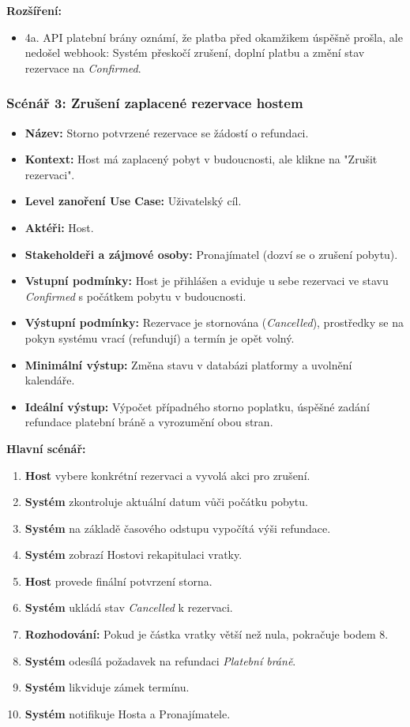 \documentclass[11pt, a4paper]{article}
\begin{document}
\noindent \textbf{Rozšíření:}
\begin{itemize}
    \item 4a. API platební brány oznámí, že platba před okamžikem úspěšně prošla, ale nedošel webhook: Systém přeskočí zrušení, doplní platbu a změní stav rezervace na \textit{Confirmed}.
\end{itemize}

\vspace{0.5cm}
\subsubsection{Scénář 3: Zrušení zaplacené rezervace hostem}
\begin{itemize}[leftmargin=*]
    \item \textbf{Název:} Storno potvrzené rezervace se žádostí o refundaci.
    \item \textbf{Kontext:} Host má zaplacený pobyt v budoucnosti, ale klikne na "Zrušit rezervaci".
    \item \textbf{Level zanoření Use Case:} Uživatelský cíl.
    \item \textbf{Aktéři:} Host.
    \item \textbf{Stakeholdeři a zájmové osoby:} Pronajímatel (dozví se o zrušení pobytu).
    \item \textbf{Vstupní podmínky:} Host je přihlášen a eviduje u sebe rezervaci ve stavu \textit{Confirmed} s počátkem pobytu v budoucnosti.
    \item \textbf{Výstupní podmínky:} Rezervace je stornována (\textit{Cancelled}), prostředky se na pokyn systému vrací (refundují) a termín je opět volný.
    \item \textbf{Minimální výstup:} Změna stavu v databázi platformy a uvolnění kalendáře.
    \item \textbf{Ideální výstup:} Výpočet případného storno poplatku, úspěšné zadání refundace platební bráně a vyrozumění obou stran.
\end{itemize}

\noindent \textbf{Hlavní scénář:}
\begin{enumerate}
    \item \textbf{Host} vybere konkrétní rezervaci a vyvolá akci pro zrušení.
    \item \textbf{Systém} zkontroluje aktuální datum vůči počátku pobytu.
    \item \textbf{Systém} na základě časového odstupu vypočítá výši refundace.
    \item \textbf{Systém} zobrazí Hostovi rekapitulaci vratky.
    \item \textbf{Host} provede finální potvrzení storna.
    \item \textbf{Systém} ukládá stav \textit{Cancelled} k rezervaci.
    \item \textbf{Rozhodování:} Pokud je částka vratky větší než nula, pokračuje bodem 8.
    \item \textbf{Systém} odesílá požadavek na refundaci \textit{Platební bráně}.
    \item \textbf{Systém} likviduje zámek termínu.
    \item \textbf{Systém} notifikuje Hosta a Pronajímatele.
\end{enumerate}
\end{document}
